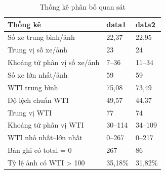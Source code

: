 \begin{table}[htbp]
        \centering
        \caption{Thống kê phân bố quan sát}
        \vspace{0.2cm}
        \begin{tabular}{|p{6cm}|p{4cm}|p{4cm}|}
            \hline
            \textbf{Thống kê} & \textbf{data1} & \textbf{data2} \\
            \hline
            Số xe trung bình/ảnh & 22,37 & 22,95 \\
            \hline
            Trung vị số xe/ảnh & 23 & 24 \\
            \hline
            Khoảng tứ phân vị số xe/ảnh & 7–36 & 11–34 \\
            \hline
            Số xe lớn nhất/ảnh & 59 & 59 \\
            \hline
            WTI trung bình & 75,08 & 73,49 \\
            \hline
            Độ lệch chuẩn WTI & 49,57 & 44,37 \\
            \hline
            Trung vị WTI & 77 & 74 \\
            \hline
            Khoảng tứ phân vị WTI & 30–114 & 34–109 \\
            \hline
            WTI nhỏ nhất–lớn nhất & 0–267 & 0–217 \\
            \hline
            Bản ghi có total = 0 & 267 & 86 \\
            \hline
            Tỷ lệ ảnh có WTI > 100 & 35,18\% & 31,82\% \\
            \hline
        \end{tabular}
    \end{table}